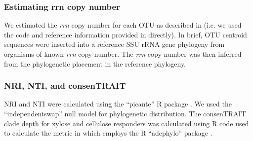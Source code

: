 \documentclass{article}
\begin{document}
\subsubsection{Estimating rrn copy number}
We estimated the \textit{rrn} copy number for each OTU as described in \citet{Kembel_2012}
(i.e. we used the code and reference information provided in \citet{Kembel_2012}
directly). In brief, OTU centroid sequences were inserted into a reference SSU
rRNA gene phylogeny \citep{matsen2010} from organisms of known \textit{rrn} copy number.
The \textit{rrn} copy number was then inferred from the phylogenetic placement
in the reference phylogeny. 

\subsubsection{NRI, NTI, and consenTRAIT}
NRI and NTI were calculated using the ``picante'' R package
\citep{kembel2010}. We used the ``independentswap'' null model for
phylogenetic distribution. The consenTRAIT clade depth for xylose and cellulose
responders was calculated using R code used to calculate the metric in
\citet{Martiny2013} which employs the R ``adephylo'' package
\citep{jombart2010}.
\end{document}
